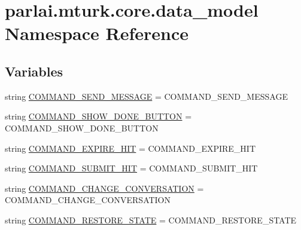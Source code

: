 \hypertarget{namespaceparlai_1_1mturk_1_1core_1_1data__model}{}\section{parlai.\+mturk.\+core.\+data\+\_\+model Namespace Reference}
\label{namespaceparlai_1_1mturk_1_1core_1_1data__model}
\subsection*{Variables}
\begin{DoxyCompactItemize}
\item 
string \hyperlink{namespaceparlai_1_1mturk_1_1core_1_1data__model_a687c4b88336c1123cc65ffe443f0545a}{C\+O\+M\+M\+A\+N\+D\+\_\+\+S\+E\+N\+D\+\_\+\+M\+E\+S\+S\+A\+GE} = \textquotesingle{}C\+O\+M\+M\+A\+N\+D\+\_\+\+S\+E\+N\+D\+\_\+\+M\+E\+S\+S\+A\+GE\textquotesingle{}
\item 
string \hyperlink{namespaceparlai_1_1mturk_1_1core_1_1data__model_aab5c44b9c041cfd317e642c91cd602bb}{C\+O\+M\+M\+A\+N\+D\+\_\+\+S\+H\+O\+W\+\_\+\+D\+O\+N\+E\+\_\+\+B\+U\+T\+T\+ON} = \textquotesingle{}C\+O\+M\+M\+A\+N\+D\+\_\+\+S\+H\+O\+W\+\_\+\+D\+O\+N\+E\+\_\+\+B\+U\+T\+T\+ON\textquotesingle{}
\item 
string \hyperlink{namespaceparlai_1_1mturk_1_1core_1_1data__model_a83d5e7846d24e8d354ae9446e1c7137d}{C\+O\+M\+M\+A\+N\+D\+\_\+\+E\+X\+P\+I\+R\+E\+\_\+\+H\+IT} = \textquotesingle{}C\+O\+M\+M\+A\+N\+D\+\_\+\+E\+X\+P\+I\+R\+E\+\_\+\+H\+IT\textquotesingle{}
\item 
string \hyperlink{namespaceparlai_1_1mturk_1_1core_1_1data__model_ab3b2dfd09f502ff9858f6bce21707cb3}{C\+O\+M\+M\+A\+N\+D\+\_\+\+S\+U\+B\+M\+I\+T\+\_\+\+H\+IT} = \textquotesingle{}C\+O\+M\+M\+A\+N\+D\+\_\+\+S\+U\+B\+M\+I\+T\+\_\+\+H\+IT\textquotesingle{}
\item 
string \hyperlink{namespaceparlai_1_1mturk_1_1core_1_1data__model_aa55b7f78d6853a3f814da01308a0e179}{C\+O\+M\+M\+A\+N\+D\+\_\+\+C\+H\+A\+N\+G\+E\+\_\+\+C\+O\+N\+V\+E\+R\+S\+A\+T\+I\+ON} = \textquotesingle{}C\+O\+M\+M\+A\+N\+D\+\_\+\+C\+H\+A\+N\+G\+E\+\_\+\+C\+O\+N\+V\+E\+R\+S\+A\+T\+I\+ON\textquotesingle{}
\item 
string \hyperlink{namespaceparlai_1_1mturk_1_1core_1_1data__model_aded9fad81fa7d820e92ac8bea08f1869}{C\+O\+M\+M\+A\+N\+D\+\_\+\+R\+E\+S\+T\+O\+R\+E\+\_\+\+S\+T\+A\+TE} = \textquotesingle{}C\+O\+M\+M\+A\+N\+D\+\_\+\+R\+E\+S\+T\+O\+R\+E\+\_\+\+S\+T\+A\+TE\textquotesingle{}

\end{DoxyCompactItemize}
